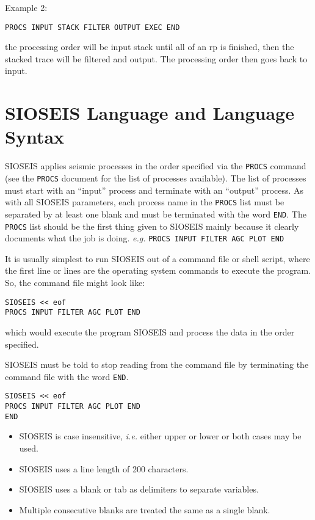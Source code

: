 Example 2:
\begin{verbatim}
PROCS INPUT STACK FILTER OUTPUT EXEC END
\end{verbatim}
the processing order will be input stack until all of an \gls{rp} is finished, then
the stacked trace will be filtered and output. The processing order then goes
back to input.

\chapter{SIOSEIS Language and Language Syntax}
\label{c_syntax}

SIOSEIS applies seismic processes in the order specified via the \texttt{PROCS}
command (see the \texttt{PROCS} document for the list of processes available).
The list of processes must start with an ``input'' process and terminate with
an ``output'' process.  As with all SIOSEIS parameters, each process name in
the \texttt{PROCS} list must be separated by at least one blank and must be
terminated with the word \texttt{END}.  The \texttt{PROCS} list should be the
first thing given to SIOSEIS mainly because it clearly documents what the job
is doing.  \textit{e.g.} \texttt{PROCS INPUT FILTER AGC PLOT END}

It is usually simplest to run SIOSEIS out of a command file or shell script,
where the first line or lines are the operating system commands to execute the
program.  So, the command file might look like:
\begin{verbatim}
SIOSEIS << eof
PROCS INPUT FILTER AGC PLOT END
\end{verbatim}
which would execute the program SIOSEIS and process the data in the order
specified.

SIOSEIS must be told to stop reading from the command file by terminating
the command file with the word \texttt{END}.
\begin{verbatim}
SIOSEIS << eof
PROCS INPUT FILTER AGC PLOT END
END
\end{verbatim}

\begin{itemize}
\item SIOSEIS is case insensitive, \textit{i.e.} either upper or lower or both
      cases may be used.
\item SIOSEIS uses a line length of 200 characters.
\item SIOSEIS uses a blank or tab as delimiters to separate variables.
\item Multiple consecutive blanks are treated the same as a single blank.
\end{itemize}

